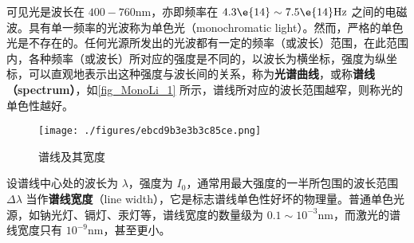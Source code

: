 

可见光是波长在 $400-760\mathrm{nm}$，亦即频率在 $4.3\e{14} \sim 7.5\e{14} \mathrm{Hz}$ 之间的电磁波。具有单一频率的光波称为单色光（monochromatic light）。然而，严格的单色光是不存在的。任何光源所发出的光波都有一定的频率（或波长）范围，在此范围内，各种频率（或波长）所对应的强度是不同的，以波长为横坐标，强度为纵坐标，可以直观地表示出这种强度与波长间的关系，称为\textbf{光谱曲线}，或称\textbf{谱线（spectrum）}，如\autoref{fig_MonoLi_1} 所示，谱线所对应的波长范围越窄，则称光的单色性越好。
\begin{figure}[ht]
\centering
\texttt{[image: ./figures/ebcd9b3e3b3c85ce.png]}
\caption{谱线及其宽度} \label{fig_MonoLi_1}
\end{figure}

设谱线中心处的波长为 $\lambda$，强度为 $I_0$，通常用最大强度的一半所包围的波长范围 $\Delta\lambda$ 当作\textbf{谱线宽度}（line width），它是标志谱线单色性好坏的物理量。普通单色光源，如钠光灯、镉灯、汞灯等，谱线宽度的数量级为 $0.1 \sim 10^{-3} \mathrm{nm}$，而激光的谱线宽度只有 $10^{-9}\mathrm{nm}$，甚至更小。
